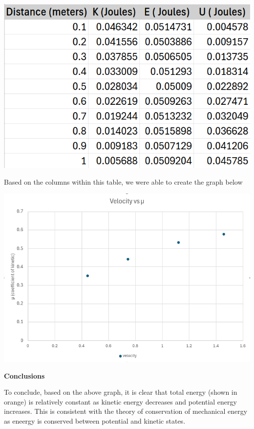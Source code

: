 \documentclass[12pt]{article}
\begin{document}
\begin{center}
    \includegraphics[scale=0.5]{table.png}
\end{center}

Based on the columns within this table, we were able to create the graph below

\begin{center}
    \includegraphics[scale=0.45]{graph.png}
\end{center}

\newpage

\textbf{Conclusions}

To conclude, based on the above graph, it is clear that total energy (shown in orange)
is relatively constant as kinetic energy decreases and potential energy increases.
This is consistent with the theory of conservation of mechanical energy as eneergy is
conserved between potential and kinetic states.
\end{document}

